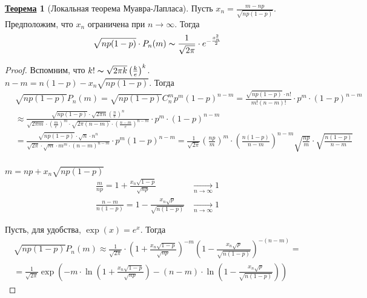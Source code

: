 \documentclass[12pt]{article}
\theoremstyle{definition} %
\newtheorem{Thm}{\underline{Теорема}}[subsection] %
\theoremstyle{plain} %
\theoremstyle{remark} %
\begin{document}
\begin{Thm}[Локальная теорема Муавра-Лапласа]
    Пусть $x_n = \frac{m - np}{\sqrt{np(1 - p)}}$. Предположим, что $x_n$ ограничена при $n \to \infty$. Тогда
    \[\sqrt{np(1 - p)} \cdot P_n(m) \thicksim \frac{1}{\sqrt{2\pi}} \cdot e^{-\frac{x_n^2}{2}}\]   
\end{Thm}

\begin{proof}
    Вспомним, что $k! \thicksim \sqrt{2\pi k} \left(\frac{k}{e}\right)^k$. \\
    $n - m = n(1 - p) - x_n\sqrt{np(1 - p)}$. Тогда
    \begin{align*}
        &\sqrt{np(1 - p)}P_n(m) = \sqrt{np(1 - p)} C_n^m p^m (1 - p)^{n - m} = \frac{\sqrt{np(1 - p)} \cdot n!}{m!(n - m)!} \cdot p^m \cdot (1 - p)^{n - m} \\
        &\approx \frac{\sqrt{np(1 - p)} \cdot \sqrt{2\pi n} \left(\frac{n}{e}\right)^n}{\sqrt{2\pi m} \cdot \left(\frac{m}{e}\right)^m \cdot \sqrt{2\pi (n - m)} \cdot \left( \frac{n - m}{e}\right)^{n - m}} \cdot p^m \cdot (1 - p)^{n - m} \\
        &= \frac{\sqrt{np(1 - p)} \cdot \sqrt{n} \cdot n^n}{\sqrt{2\pi} \cdot \sqrt{m} \cdot m^m \cdot (n - m)^{n - m}} \cdot p^m (1 - p)^{n - m} = \frac{1}{\sqrt{2\pi}} \left( \frac{np}{m}\right)^m \cdot \left( \frac{n(1 - p)}{n - m}\right)^{n - m} \sqrt{ \frac{np}{m}} \cdot \sqrt{ \frac{n(1 - p)}{n - m}}\\
    \end{align*} 

    $m = np + x_n\sqrt{np(1 - p)}$
    \begin{align*}
        \frac{m}{np} = 1 + \frac{x_n\sqrt{1 - p}}{\sqrt{np}} &\xrightarrow[n \to \infty]{} 1 \\
        \frac{n - m}{n(1 - p)} = 1 - \frac{x_n\sqrt{p}}{\sqrt{n(1 - p)}} &\xrightarrow[n \to \infty]{} 1
    \end{align*} 

    Пусть, для удобства, $\exp(x) = e^x$. Тогда 
    \begin{gather*}
        \sqrt{np(1 - p)}P_n(m) \approx \frac{1}{\sqrt{2\pi}} \cdot \left(1 + \frac{x_n\sqrt{1 - p}}{\sqrt{np}}\right)^{-m} \left(1 - \frac{x_n\sqrt{p}}{\sqrt{n(1 - p)}}\right)^{-(n - m)} = \\
        = \frac{1}{\sqrt{2\pi}} \exp\left({-m \cdot \ln \left(1 + \frac{x_n\sqrt{1 - p}}{\sqrt{np}}\right) - (n - m) \cdot \ln \left(1 - \frac{x_n\sqrt{p}}{\sqrt{n(1 - p)}}\right)}\right)
    \end{gather*}


\end{proof}
\end{document}
